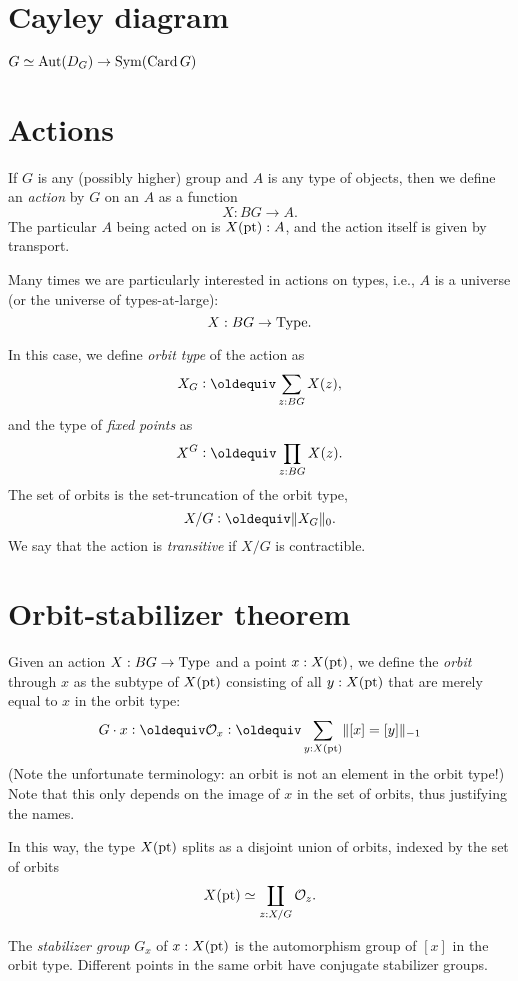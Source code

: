 \label{ch:symmetry}

\section{Cayley diagram}
\label{sec:cayley-diagram}

$G \simeq \operatorname{Aut}(D_G) \to \operatorname{Sym}(\operatorname{Card} G)$

\section{Actions}
\label{sec:actions}

If $G$ is any (possibly higher) group and $A$ is any type of objects,
then we define an \emph{action} by $G$ on an $A$ as a function
\[
  X : BG \to A.
\]
The particular $A$ being acted on is $X({\mathord{\mathrm{pt}}}):A$,
and the action itself is given by transport.

Many times we are particularly interested in actions on types,
i.e., $A$ is a universe (or the universe of types-at-large):
\[
  X : BG \to \mathord{\mathrm{Type}}.
\]

In this case, we define \emph{orbit type} of the action as
\[
  X_G \defeq \sum_{z:BG} X(z),
\]
and the type of \emph{fixed points} as
\[
  X^G \defeq \prod_{z:BG} X(z).
\]
The set of orbits is the set-truncation of the orbit type,
\[
  X / G \defeq \Trunc{X_G}_0.
\]
We say that the action is \emph{transitive} if $X / G$ is contractible.

\section{Orbit-stabilizer theorem}
\label{sec:orbit-stabilizer-theorem}

Given an action $X : BG \to \mathord{\mathrm{Type}}$ and a point $x : X({\mathord{\mathrm{pt}}})$, we define
the \emph{orbit} through $x$ as the subtype of $X({\mathord{\mathrm{pt}}})$ consisting of
all $y : X({\mathord{\mathrm{pt}}})$ that are merely equal to $x$ in the orbit type:
\[
  G\cdot x \defeq \mathcal O_x \defeq \sum_{y : X(\pt)} \merely{[x] = [y]}
\]
(Note the unfortunate terminology: an orbit is not an element in the
orbit type!)
Note that this only depends on the image of $x$ in the set of orbits,
thus justifying the names.

In this way, the type $X({\mathord{\mathrm{pt}}})$ splits as a disjoint union of orbits,
indexed by the set of orbits
\[
  X({\mathord{\mathrm{pt}}}) \simeq \coprod_{z : X / G} \mathcal O_z.
\]

The \emph{stabilizer group} $G_x$ of $x : X({\mathord{\mathrm{pt}}})$ is the automorphism group of $[x]$ in the orbit type.
Different points in the same orbit have conjugate stabilizer groups.

